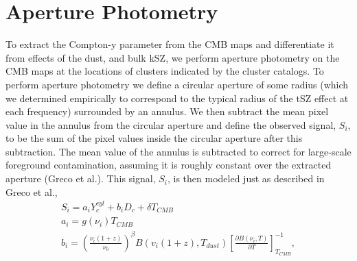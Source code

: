 \documentclass{princeton_astro_thesis}
\begin{document}
\section{Aperture Photometry}
To extract the Compton-y parameter from the CMB maps and differentiate it from effects of the dust, and bulk kSZ, we perform aperture photometry on the CMB maps at the locations of clusters indicated by the cluster catalogs. To perform aperture photometry we define a circular aperture of some radius (which we determined empirically to correspond to the typical radius of the tSZ effect at each frequency) surrounded by an annulus. We then subtract the mean pixel value in the annulus from the circular aperture and define the observed signal, $S_i$, to be the sum of the pixel values inside the circular aperture after this subtraction. The mean value of the annulus is subtracted to correct for large-scale foreground contamination, assuming it is roughly constant over the extracted aperture (Greco et al.). This signal, $S_i$, is then modeled just as described in Greco et al.,
\begin{equation}
\begin{aligned}
S_i=a_i Y^{cyl}_{c}+b_i D_c +\delta T_{CMB} \\
a_i=g(\nu_i) T_{CMB}\\
b_i=\left(\frac{\nu_i(1+z)}{\nu_0}\right)^\beta B (v_i(1+z),T_{dust})\left[\frac{\partial B(\nu_i,T)}{\partial T} \right]^{-1}_{T_{CMB}},
\end{aligned}
\end{equation}
\end{document}
